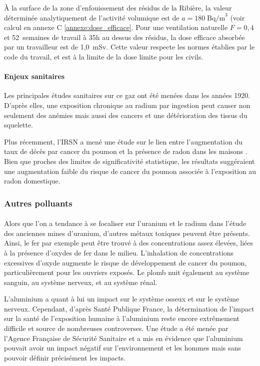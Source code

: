 \documentclass{article}
\begin{document}
À la surface de la zone d’enfouissement des résidus de la Ribière, la valeur déterminée analytiquement de l’activité volumique est de $a=180 \; \text{Bq/m}^3$ (voir calcul en annexe C \ref{annexe:dose_efficace}. Pour une ventilation naturelle $F=0,4$ et 52~semaines de travail à 35h au dessus des résidus, la dose efficace absorbée par un travailleur est de 1,0~mSv. Cette valeur respecte les normes établies par le code du travail, et est à la limite de la dose limite pour les civils.

\paragraph{Enjeux sanitaires} Les principales études sanitaires sur ce gaz ont été menées dans les années 1920. D’après elles, une exposition chronique au radium par ingestion peut causer non seulement des anémies mais aussi des cancers et une détérioration des tissus du squelette.

Plus récemment, l’IRSN a mené une étude sur le lien entre l’augmentation du taux de décès par cancer du poumon et la présence de radon dans les maisons \cite{darby_radon_2005}. Bien que proches des limites de significativité statistique, les résultats suggéraient une augmentation faible du risque de cancer du poumon associée à l’exposition au radon  domestique.

\subsubsection{Autres polluants}

\paragraph{} Alors que l’on a tendance à se focaliser sur l’uranium et le radium dans l’étude des anciennes mines d’uranium, d'autres métaux toxiques peuvent être présents. Ainsi, le fer par exemple peut être trouvé à des concentrations assez élevées, liées à la présence d'oxydes de fer dans le milieu. L'inhalation de concentrations excessives d'oxyde augmente le risque de développement de cancer du poumon, particulièrement pour les ouvriers exposés. Le plomb nuit également au système sanguin, au système nerveux, et au système rénal.

L’aluminium a quant à lui un impact sur le système osseux et sur le système nerveux. Cependant, d’après Santé Publique France, la détermination de l'impact sur la santé de l'exposition humaine à l'aluminium reste encore extrêmement difficile et source de nombreuses controverses. Une étude a été menée par l’Agence Française de Sécurité Sanitaire et a mis en évidence que l’aluminium pouvait avoir un impact négatif sur l’environnement et les hommes mais sans pouvoir définir précisément les impacts.
\end{document}
